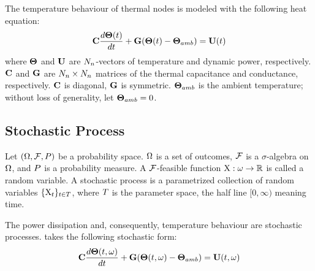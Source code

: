 The temperature behaviour of thermal nodes is modeled with the following heat equation:
\begin{equation} \equlabel{fourier}
  \mcapacitance \frac{d\vtemperature(\time)}{d\time} + \mconductance (\vtemperature(\time) - \vtemperature_{amb}) = \vpower(\time)
\end{equation}
where $\mathbf{\Theta}$ and $\mathbf{U}$ are $N_n$-vectors of temperature and dynamic power, respectively. $\mathbf{C}$ and $\mathbf{G}$ are $N_n \times N_n$ matrices of the thermal capacitance and conductance, respectively. $\mathbf{C}$ is diagonal, $\mathbf{G}$ is symmetric. $\mathbf{\Theta}_{amb}$ is the ambient temperature; without loss of generality, let $\mathbf{\Theta}_{amb} = 0$.

\subsection{Stochastic Process}
Let $(\Omega, \mathcal{F}, P)$ be a probability space. $\Omega$ is a set of outcomes, $\mathcal{F}$ is a $\sigma$-algebra on $\Omega$, and $P$ is a probability measure. A $\mathcal{F}$-feasible function $\mbox{X}: \omega \to \mathbb{R}$ is called a random variable. A stochastic process is a parametrized collection of random variables $\{ \mbox{X}_t \}_{t \in T}$, where $T$ is the parameter space, the half line $[0, \infty)$ meaning time.

The power dissipation and, consequently, temperature behaviour are stochastic processes.  takes the following stochastic form:
\begin{equation} \equlabel{stochastic-fourier}
  \mcapacitance \frac{d\svtemperature(\time, \outcome)}{d\time} + \mconductance (\svtemperature(\time, \outcome) - \vtemperature_{amb}) = \svpower(\time, \outcome)
\end{equation}
